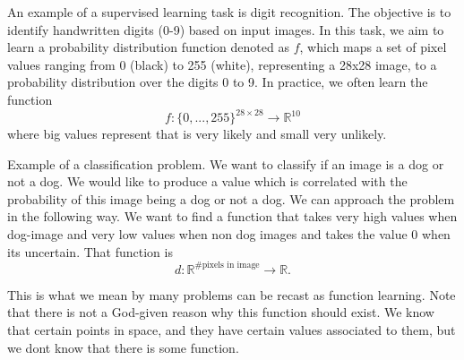 \documentclass[../main.tex]{subfiles}
\begin{document}
	\begin{xmpl}
		\noindent An example of a supervised learning task is digit recognition. The objective is to identify handwritten digits (0-9) based on input images. In this task, we aim to learn a probability distribution function denoted as $f$, which maps a set of pixel values ranging from 0 (black) to 255 (white), representing a 28x28 image, to a probability distribution over the digits 0 to 9. In practice, we often learn the function 
		$$f: \{0,...,255\}^{28 \times 28} \longrightarrow \mathbb{R}^{10}$$
		where big values represent that is very likely and small very unlikely. 
	\end{xmpl}
	\begin{xmpl} Example of a classification problem. We want to classify if an image is a dog or not a dog. We would like to produce a value which is correlated with the probability of this image being a dog or not a dog.  We can approach the problem in the following way. We want to find a function that takes very high values when dog-image and very low values when non dog images and takes the value 0 when its uncertain. That function is
		$$d: \mathbb{R}^{\# \text{pixels in image}} \rightarrow \mathbb{R}. $$
		
		\noindent This is what we mean by many problems can be recast as function learning. Note that there is not a God-given reason why this function should exist. We know that certain points in space, and they have certain values associated to them, but we dont know that there is some function. 
	\end{xmpl}

	
\end{document}
